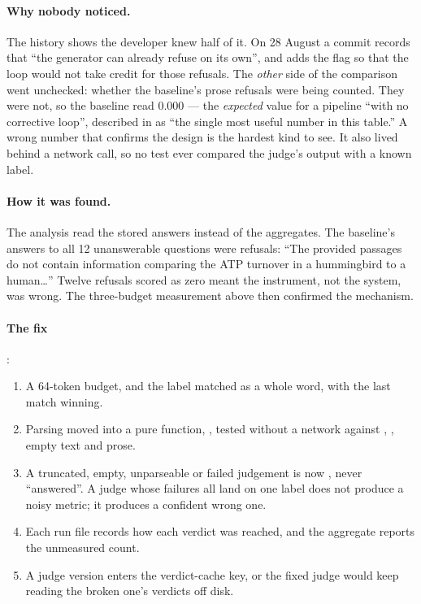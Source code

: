 \paragraph{Why nobody noticed.} The history shows the developer knew half of it. On 28 August a commit records that ``the generator can already refuse on its own'', and adds the  flag so that the loop would not take credit for those refusals. The \emph{other} side of the comparison went unchecked: whether the baseline's prose refusals were being counted. They were not, so the baseline read 0.000 --- the \emph{expected} value for a pipeline ``with no corrective loop'', described in  as ``the single most useful number in this table.'' A wrong number that confirms the design is the hardest kind to see. It also lived behind a network call, so no test ever compared the judge's output with a known label.

\paragraph{How it was found.} The analysis read the stored answers instead of the aggregates. The baseline's answers to all 12 unanswerable questions were refusals: ``The provided passages do not contain information comparing the ATP turnover in a hummingbird to a human\ldots'' Twelve refusals scored as zero meant the instrument, not the system, was wrong. The three-budget measurement above then confirmed the mechanism.

\paragraph{The fix} :
\begin{enumerate}
  \item A 64-token budget, and the label matched as a whole word, with the last match winning.
  \item Parsing moved into a pure function, , tested without a network against , , empty text and prose.
  \item A truncated, empty, unparseable or failed judgement is now , never ``answered''. A judge whose failures all land on one label does not produce a noisy metric; it produces a confident wrong one.
  \item Each run file records how each verdict was reached, and the aggregate reports the unmeasured count.
  \item A judge version enters the verdict-cache key, or the fixed judge would keep reading the broken one's verdicts off disk.
\end{enumerate}

